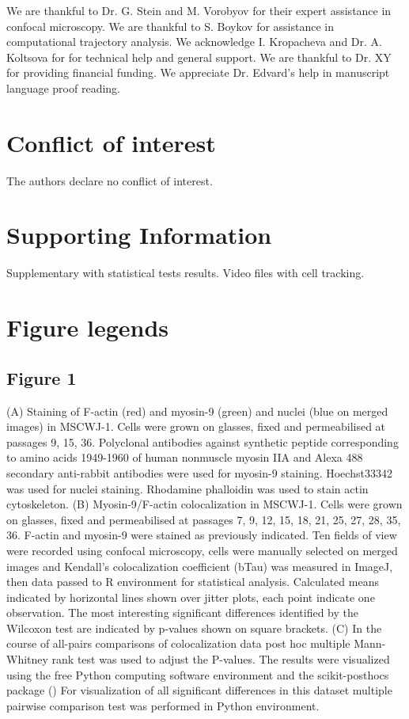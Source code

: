 \documentclass[alpha-refs]{wiley-article}
\begin{document}
We are thankful to Dr. G. Stein and M. Vorobyov for their expert assistance in confocal microscopy.
We are thankful to S. Boykov for assistance in computational trajectory analysis.
We acknowledge I. Kropacheva and Dr. A. Koltsova for for technical help and general support.
We are thankful to Dr. XY for providing financial funding.
We appreciate Dr. Edvard's help in manuscript language proof reading.

\section*{Conflict of interest}
The authors declare no conflict of interest.





\section*{Supporting Information}

Supplementary with statistical tests results.
Video files with cell tracking.

\section*{Figure legends}

\subsection*{Figure 1}
(A) Staining of F-actin (red) and myosin-9 (green) and nuclei (blue on merged images) in MSCWJ-1.
Cells were grown on glasses, fixed and permeabilised at passages 9, 15, 36.
Polyclonal antibodies against synthetic peptide corresponding to amino acids 1949-1960 of human nonmuscle myosin IIA and Alexa 488 secondary anti-rabbit antibodies were used for myosin-9 staining.
Hoechst33342 was used for nuclei staining.
Rhodamine phalloidin was used to stain actin cytoskeleton.
(B) Myosin-9/F-actin colocalization in MSCWJ-1.
Cells were grown on glasses, fixed and permeabilised at passages 7, 9, 12, 15, 18, 21, 25, 27, 28, 35, 36.
F-actin and myosin-9 were stained as previously indicated.
Ten fields of view were recorded using confocal microscopy, cells were manually selected on merged images and Kendall's colocalization coefficient (bTau) was measured in ImageJ, then data passed to R environment for statistical analysis.
Calculated means indicated by horizontal lines shown over jitter plots, each point indicate one observation.
The most interesting significant differences identified by the Wilcoxon test are indicated by p-values shown on square brackets.
(C) In the course of all-pairs comparisons of colocalization data post hoc multiple Mann-Whitney rank test was used to adjust the P-values.
The results were visualized using the free Python computing software environment and the scikit-posthocs package (\cite{Terpilowski2019})
For visualization of all significant differences in this dataset multiple pairwise comparison test was performed in Python environment.
\end{document}
